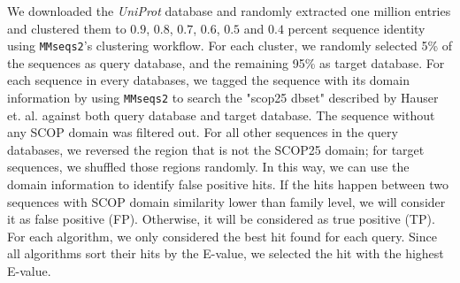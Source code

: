 We downloaded the \textit{UniProt} database and randomly extracted one million entries and clustered them to $0.9$, $0.8$, $0.7$, $0.6$, $0.5$ and $0.4$ percent sequence identity using \texttt{MMseqs2}'s clustering workflow.
For each cluster, we randomly selected 5\% of the sequences as query database, and the remaining 95\% as target database.
For each sequence in every databases, we tagged the sequence with its domain information by using \texttt{MMseqs2} to search the "scop25 dbset" described by Hauser et.
al.
\cite{hauserbioinformaticsbtw006} against both query database and target database.
The sequence without any SCOP domain was filtered out.
For all other sequences in the query databases, we reversed the region that is not the SCOP25 domain; for target sequences, we shuffled those regions randomly.
In this way, we can use the domain information to identify false positive hits.
If the hits happen between two sequences with SCOP domain similarity lower than family level, we will consider it as false positive (FP).
Otherwise, it will be considered as true positive (TP).
For each algorithm, we only considered the best hit found for each query.
Since all algorithms
sort their hits by the E-value, we selected the hit with the highest E-value.
